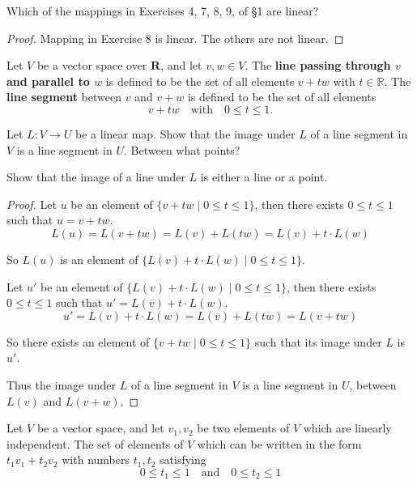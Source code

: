 \begin{exercise}
    Which of the mappings in Exercises 4, 7, 8, 9, of \S{1} are linear?
\end{exercise}

\begin{proof}
    Mapping in Exercise 8 is linear. The others are not linear.
\end{proof}

\begin{exercise}
    Let $V$ be a vector space over $\mathbf{R}$, and let $v, w\in V$. The \textbf{line passing through $v$ and parallel to $w$} is defined to be the set of all elements $v + tw$ with $t\in\mathbb{R}$. The \textbf{line segment} between $v$ and $v + w$ is defined to be the set of all elements
    \[
        v + tw \quad\text{with}\quad 0 \leq t \leq 1.
    \]

    Let $L: V \to U$ be a linear map. Show that the image under $L$ of a line segment in $V$ is a line segment in $U$. Between what points?

    Show that the image of a line under $L$ is either a line or a point.
\end{exercise}

\begin{proof}
    Let $u$ be an element of $\{ v + tw \mid 0 \leq t \leq 1 \}$, then there exists $0 \leq t \leq 1$ such that $u = v + tw$.
    \[
        L(u) = L(v + tw) = L(v) + L(tw) = L(v) + t\cdot L(w)
    \]

    So $L(u)$ is an element of $\{ L(v) + t\cdot L(w) \mid 0\leq t\leq 1 \}$.

    Let $u'$ be an element of $\{ L(v) + t\cdot L(w) \mid 0\leq t\leq 1 \}$, then there exists $0\leq t\leq 1$ such that $u' = L(v) + t\cdot L(w)$.
    \[
        u' = L(v) + t\cdot L(w) = L(v) + L(tw) = L(v + tw)
    \]

    So there exists an element of $\{ v + tw \mid 0 \leq t\leq 1 \}$ such that its image under $L$ is $u'$.

    Thus the image under $L$ of a line segment in $V$ is a line segment in $U$, between $L(v)$ and $L(v + w)$.
\end{proof}

Let $V$ be a vector space, and let $v_{1}, v_{2}$ be two elements of $V$ which are linearly independent. The set of elements of $V$ which can be written in the form $t_{1}v_{1} + t_{2}v_{2}$ with numbers $t_{1}, t_{2}$ satisfying
\[
    0 \leq t_{1} \leq 1 \quad\text{and}\quad 0 \leq t_{2} \leq 1
\]

